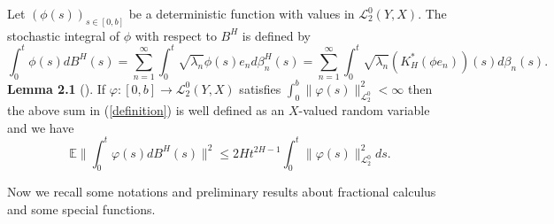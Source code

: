 \documentclass[12pt,a4paper,oneside,reqno,notitlepage]{amsart}
\theoremstyle{plain}
\numberwithin{equation}{section}
\begin{document}
Let $(\phi(s))_{s\in[0,b]}$ be a deterministic function with values in $\mathcal{L}_{2}^{0}(Y,X)$. The stochastic integral of $\phi$ with respect to $B^{H}$ is defined by
\begin{equation}\label{definition}
\int_{0}^{t}\phi(s)dB^{H}(s)=\sum_{n=1}^{\infty}\int_{0}^{t}\sqrt{\lambda_{n}}\phi(s)e_{n}d\beta_{n}^{H}(s)=\sum_{n=1}^{\infty}\int_{0}^{t}\sqrt{\lambda_{n}}(K_{H}^{*}(\phi e_{n}))(s)d\beta_{n}(s).
\end{equation}
\textbf{Lemma 2.1} (\cite{Boufoussi}). If $\varphi: [0,b]\rightarrow \mathcal{L}_{2}^{0}(Y,X)$ satisfies $\int_{0}^{b}\|\varphi(s)\|_{\mathcal{L}_{2}^{0}}^{2}<\infty$ then the above sum in
(\ref{definition}) is well defined as an $X$-valued random variable and we have
\begin{equation*}
\mathbb{E}\|\int_{0}^{t}\varphi(s)dB^{H}(s)\|^{2}\leq 2Ht^{2H-1}\int_{0}^{t}\|\varphi(s)\|_{\mathcal{L}_{2}^{0}}^{2}ds.
\end{equation*}

Now we recall some notations and preliminary results about fractional calculus and some special functions.
\end{document}
